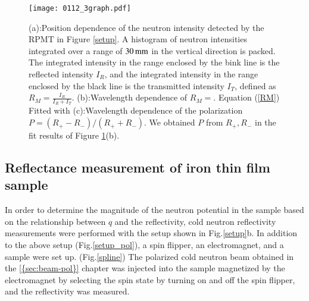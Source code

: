 \documentclass{jps-cp}
\begin{document}
 \begin{figure}[tbh]
 \texttt{[image: 0112\_3graph.pdf]}
 \centering
 \caption{(a):Position dependence of the neutron intensity detected by the RPMT in Figure \ref{setup}. A histogram of neutron intensities integrated over a range of $30\,\rm mm$ in the vertical direction is packed. The integrated intensity in the range enclosed by the bink line is the reflected intensity $I_R$, and the integrated intensity in the range enclosed by the black line is the transmitted intensity $I_T$, defined as $R_M=\frac{I_R}{I_R+I_T}$. (b):Wavelength dependence of $R_M=$. Equation (\ref{RM})
 Fitted with (c):Wavelength dependence of the polarization $P=(R_{+}-R_{-})/(R_{+}+R_{-})$. We obtained $P$ from $R_{+},R_{-}$ in the fit results of Figure \ref{3graph}(b).
 }
 \label{3graph}
 \end{figure}
 

\subsection{Reflectance measurement of iron thin film sample}\label{sec:sample}
In order to determine the magnitude of the neutron potential in the sample based on the relationship between $q$ and the reflectivity, cold neutron reflectivity measurements were performed with the setup shown in Fig.\ref{setup}b.
In addition to the above setup (Fig.\ref{setup_pol}), a spin flipper, an electromagnet, and a sample were set up. (Fig.\ref{spline})
The polarized cold neutron beam obtained in the \ref{{sec:beam-pol}} chapter was injected into the sample magnetized by the electromagnet by selecting the spin state by turning on and off the spin flipper, and the reflectivity was measured.
\end{document}
